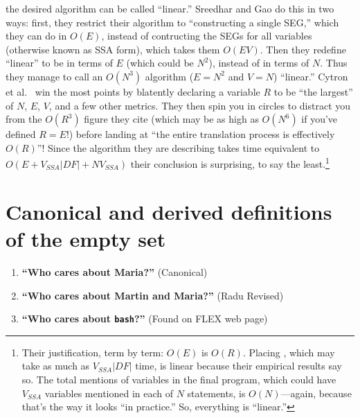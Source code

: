\documentclass[12pt,titlepage]{article}
\newcommand{\mysection}[1]{\section{#1}\setcounter{figure}{0}}
\begin{document}
\begin{enumerate}
the desired algorithm can be called ``linear.''  Sreedhar and Gao
\cite{sreedhar95:lintime} do this in two ways: first, they restrict
their algorithm to ``constructing a single SEG,'' which they can do in
$O(E)$, instead of contructing the SEGs for all variables (otherwise
known as SSA form), which takes them $O(EV)$.  Then they redefine
``linear'' to be in terms of $E$ (which could be $N^2$), instead of in
terms of $N$.  Thus they manage to call an $O(N^3)$ algorithm ($E=N^2$
and $V=N$) ``linear.''  Cytron et al.\ \cite{cytron91:ssa} win the
most points by blatently declaring a variable $R$ to be ``the
largest'' of $N$, $E$, $V$, and a few other metrics.  They then spin
you in circles to distract you from the $O(R^3)$ figure they cite
(which may be as high as $O(N^6)$ if you've defined $R=E$!) before
landing at ``the entire translation process is effectively $O(R)$''!
Since the algorithm they are describing takes time equivalent to
$O(E+V_{SSA}|{DF}|+NV_{SSA})$ their conclusion is surprising, to say
the least.\footnote{Their justification, term by term: $O(E)$ is
$O(R)$.  Placing , which may take as much as
$V_{SSA}|{DF}|$ time, is linear because their empirical results say
so.  The total mentions of variables in the final program, which could
have $V_{SSA}$ variables mentioned in each of $N$ statements, is
$O(N)$---again, because that's the way it looks ``in practice.''  So,
everything is ``linear.''}
\end{enumerate}

\mysection{Canonical and derived definitions of the empty set}
\begin{enumerate}
\item \textbf{``Who cares about Maria?''} (Canonical) \cite{marinov99}
\item \textbf{``Who cares about Martin and Maria?''} (Radu Revised)
\item \textbf{``Who cares about \texttt{bash}?''} (Found on FLEX web page)
\end{enumerate}
\end{document}
